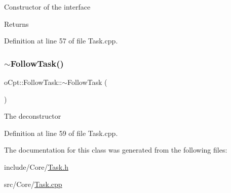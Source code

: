 Constructor of the interface \begin{DoxyReturn}{Returns}

\end{DoxyReturn}


Definition at line 57 of file Task.\+cpp.

\hypertarget{classo_cpt_1_1_follow_task_ab93d2570c1e65704f6742aa5f3f6a440}{}\label{classo_cpt_1_1_follow_task_ab93d2570c1e65704f6742aa5f3f6a440} 
\subsubsection{\texorpdfstring{$\sim$\+Follow\+Task()}{~FollowTask()}}
{\footnotesize\ttfamily o\+Cpt\+::\+Follow\+Task\+::$\sim$\+Follow\+Task (\begin{DoxyParamCaption}{ }\end{DoxyParamCaption})\hspace{0.3cm}{\ttfamily [virtual]}}

The deconstructor 

Definition at line 59 of file Task.\+cpp.



The documentation for this class was generated from the following files\+:\begin{DoxyCompactItemize}
\item 
include/\+Core/\hyperlink{_task_8h}{Task.\+h}\item 
src/\+Core/\hyperlink{_task_8cpp}{Task.\+cpp}\end{DoxyCompactItemize}
